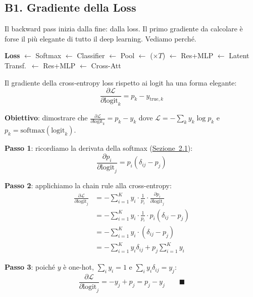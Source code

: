 \documentclass[12pt,a4paper]{article}
\begin{document}
\subsection{B1. Gradiente della Loss} \label{sec:grad_loss}

Il backward pass inizia dalla fine: dalla loss. Il primo gradiente da calcolare \`e forse il pi\`u elegante di tutto il deep learning. Vediamo perch\'e.

\begin{pipelinebox}[title={\small Backward --- Passo corrente evidenziato}]
\textbf{Loss} $\leftarrow$ Softmax $\leftarrow$ Classifier $\leftarrow$ Pool $\leftarrow$ ($\times T$) $\leftarrow$ Res+MLP $\leftarrow$ Latent Transf.\ $\leftarrow$ Res+MLP $\leftarrow$ Cross-Att
\end{pipelinebox}

\begin{formulabox}
Il gradiente della cross-entropy loss rispetto ai logit ha una forma elegante:
\[
    \frac{\partial \mathcal{L}}{\partial \text{logit}_k} = p_k - y_{\text{true},k}
\]
\end{formulabox}

\begin{proofbox}
\textbf{Obiettivo}: dimostrare che $\frac{\partial \mathcal{L}}{\partial \text{logit}_k} = p_k - y_k$ dove $\mathcal{L} = -\sum_k y_k \log p_k$ e $p_k = \text{softmax}(\text{logit}_k)$.

\textbf{Passo 1}: ricordiamo la derivata della softmax (\hyperref[sec:softmax]{Sezione~2.1}):
\[
    \frac{\partial p_i}{\partial \text{logit}_j} = p_i(\delta_{ij} - p_j)
\]

\textbf{Passo 2}: applichiamo la chain rule alla cross-entropy:
\begin{align*}
    \frac{\partial \mathcal{L}}{\partial \text{logit}_j} &= -\sum_{i=1}^{K} y_i \cdot \frac{1}{p_i} \cdot \frac{\partial p_i}{\partial \text{logit}_j} \\
    &= -\sum_{i=1}^{K} y_i \cdot \frac{1}{p_i} \cdot p_i(\delta_{ij} - p_j) \\
    &= -\sum_{i=1}^{K} y_i \cdot (\delta_{ij} - p_j) \\
    &= -\sum_{i=1}^{K} y_i \delta_{ij} + p_j \sum_{i=1}^{K} y_i
\end{align*}

\textbf{Passo 3}: poich\'e $y$ \`e one-hot, $\sum_i y_i = 1$ e $\sum_i y_i \delta_{ij} = y_j$:
\[
    \frac{\partial \mathcal{L}}{\partial \text{logit}_j} = -y_j + p_j = p_j - y_j \qquad \blacksquare
\]
\end{proofbox}
\end{document}
